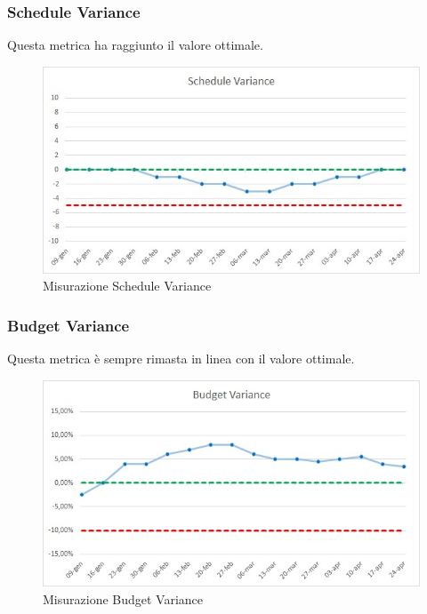 \subsubsection{Schedule Variance}
Questa metrica ha raggiunto il valore ottimale.
\begin{figure} [H]
	\centering
	\includegraphics[scale=1]{Img/schedulev}
	\caption{Misurazione Schedule Variance}\label{}
\end{figure}

\subsubsection{Budget Variance}
Questa metrica è sempre rimasta in linea con il valore ottimale.
\begin{figure} [H]
	\centering
	\includegraphics[scale=1]{Img/budgetv}
	\caption{Misurazione Budget Variance}\label{}
\end{figure}

